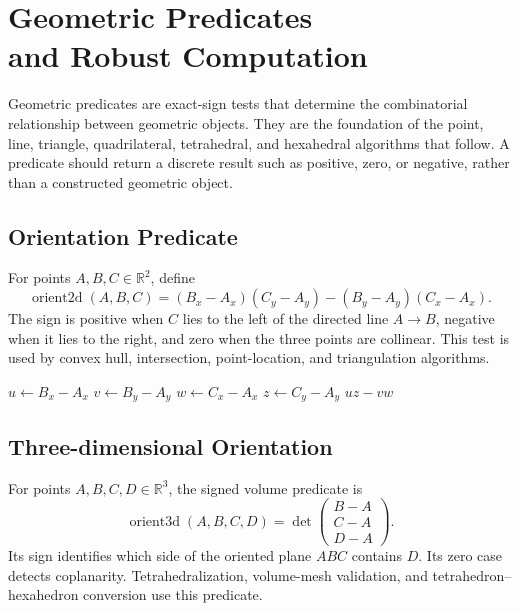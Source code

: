 \chapter[Geometric Predicates and Robust Computation]{Geometric Predicates\\ and Robust Computation}
\label{ch:geometric_predicates}

Geometric predicates are exact-sign tests that determine the combinatorial
relationship between geometric objects. They are the foundation of the
point, line, triangle, quadrilateral, tetrahedral, and hexahedral algorithms
that follow. A predicate should return a discrete result such as positive,
zero, or negative, rather than a constructed geometric object.

\section{Orientation Predicate}
\label{sec:orientation_predicate}

For points $A,B,C \in \mathbb{R}^2$, define
\[
  \operatorname{orient2d}(A,B,C) =
  (B_x-A_x)(C_y-A_y) - (B_y-A_y)(C_x-A_x).
\]
The sign is positive when $C$ lies to the left of the directed line
$A\mathbin{\to}B$, negative when it lies to the right, and zero when the
three points are collinear. This test is used by convex hull, intersection,
point-location, and triangulation algorithms.

\begin{algorithm}[H]
\caption{Two-dimensional orientation test}
\label{alg:orient2d}
\begin{algorithmic}[1]
  \State $u \gets B_x-A_x$
  \State $v \gets B_y-A_y$
  \State $w \gets C_x-A_x$
  \State $z \gets C_y-A_y$
  \State \Return $u z-v w$
\EndFunction
\end{algorithmic}
\end{algorithm}

\section{Three-dimensional Orientation}
\label{sec:orientation3d_predicate}

For points $A,B,C,D \in \mathbb{R}^3$, the signed volume predicate is
\[
  \operatorname{orient3d}(A,B,C,D) =
  \det\begin{pmatrix}
    B-A\\ C-A\\ D-A
  \end{pmatrix}.
\]
Its sign identifies which side of the oriented plane $ABC$ contains $D$.
Its zero case detects coplanarity. Tetrahedralization, volume-mesh
validation, and tetrahedron--hexahedron conversion use this predicate.

